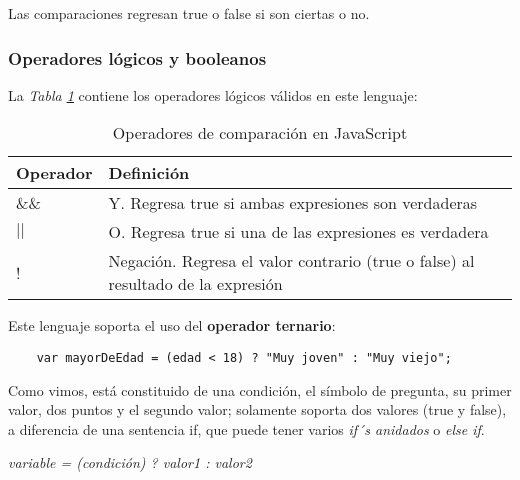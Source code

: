 Las comparaciones regresan true o false si son ciertas o no.


\subsubsection{Operadores lógicos y booleanos}
\hspace{0.55cm}La \textit{Tabla \ref{tab: 5}} contiene los operadores lógicos válidos en este lenguaje:
\begin{table}[H]
    \begin{center}
        \caption{Operadores de comparación en JavaScript}
        \label{tab: 5}
        \begin{tabular}{m{3cm} m{10cm}}
            \hline
            \textbf{Operador}&\textbf{Definición} \\
            \hline
            \&\& & Y. Regresa true si ambas expresiones son verdaderas \\
            $||$ & O. Regresa true si una de las expresiones es verdadera \\
            ! & Negación. Regresa el valor contrario (true o false) al resultado de la expresión \\
            \hline
        \end{tabular}
    \end{center}
\end{table}

Este lenguaje soporta el uso del \textbf{operador ternario}:
\begin{lstlisting}
    var mayorDeEdad = (edad < 18) ? "Muy joven" : "Muy viejo";
\end{lstlisting}

Como vimos, está constituido de una condición, el símbolo de pregunta, su primer valor, dos puntos y el segundo valor; solamente soporta dos valores (true y false), a diferencia de una sentencia if, que puede tener varios \textit{if´s anidados} o \textit{else if}.
\begin{center}
    \textit{variable = (condición) ? valor1 : valor2}
\end{center}

